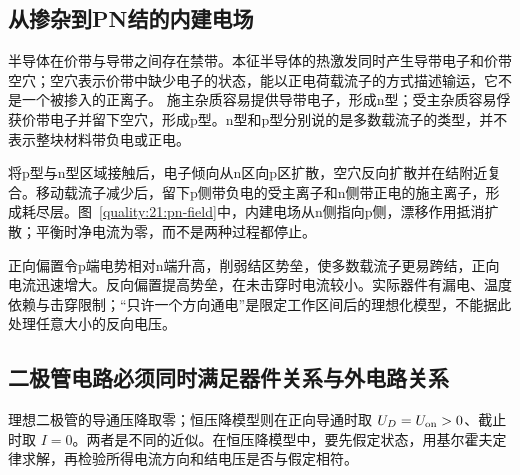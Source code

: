 \subsection{从掺杂到PN结的内建电场}
半导体在价带与导带之间存在禁带。本征半导体的热激发同时产生导带电子和价带空穴；空穴表示价带中缺少电子的状态，能以正电荷载流子的方式描述输运，它不是一个被掺入的正离子。
施主杂质容易提供导带电子，形成n型；受主杂质容易俘获价带电子并留下空穴，形成p型。n型和p型分别说的是多数载流子的类型，并不表示整块材料带负电或正电。

将p型与n型区域接触后，电子倾向从n区向p区扩散，空穴反向扩散并在结附近复合。移动载流子减少后，留下p侧带负电的受主离子和n侧带正电的施主离子，形成耗尽层。图~\ref{quality:21:pn-field}中，内建电场从n侧指向p侧，漂移作用抵消扩散；平衡时净电流为零，而不是两种过程都停止。
\begin{qualityfigure}
\label{quality:21:pn-field}
\end{qualityfigure}
正向偏置令p端电势相对n端升高，削弱结区势垒，使多数载流子更易跨结，正向电流迅速增大。反向偏置提高势垒，在未击穿时电流较小。实际器件有漏电、温度依赖与击穿限制；“只许一个方向通电”是限定工作区间后的理想化模型，不能据此处理任意大小的反向电压。

\subsection{二极管电路必须同时满足器件关系与外电路关系}
理想二极管的导通压降取零；恒压降模型则在正向导通时取 $U_D=U_{\rm on}>0$、截止时取 $I=0$。两者是不同的近似。在恒压降模型中，要先假定状态，用基尔霍夫定律求解，再检验所得电流方向和结电压是否与假定相符。


